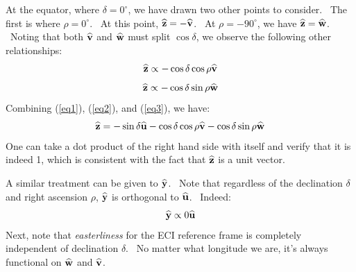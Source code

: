 \documentclass{article}
\newcommand{\tmstrong}[1]{\textbf{#1}}
\newcommand{\tmtextit}[1]{{\itshape{#1}}}
\begin{document}
At the equator, where $\delta = 0^{\circ}$, we have drawn two other points to
consider. \ The first is where $\rho = 0^{\circ}$. \ At this point,
$\widehat{\text{{\tmstrong{z}}}} = -
\text{$\widehat{\text{{\tmstrong{v}}}}$}$. \ At $\rho = - 90^{\circ}$, we have
$\widehat{\text{{\tmstrong{z}}}} = \text{$\widehat{\text{{\tmstrong{w}}}}$}$.
\ Noting that both $\text{$\widehat{\text{{\tmstrong{v}}}}$}$ and
$\text{$\widehat{\text{{\tmstrong{w}}}}$}$ must split $\cos \delta$, we
observe the following other relationships:
\begin{equation}
  \widehat{\text{{\tmstrong{z}}}} \propto - \cos \delta \cos \rho
  \text{$\widehat{\text{{\tmstrong{v}}}}$} \label{eq2}
\end{equation}
\begin{equation}
  \widehat{\text{{\tmstrong{z}}}} \propto - \cos \delta \sin \rho
  \text{$\widehat{\text{{\tmstrong{w}}}}$} \label{eq3}
\end{equation}
Combining (\ref{eq1}), (\ref{eq2}), and (\ref{eq3}), we have:
\begin{equation}
  \widehat{\text{{\tmstrong{z}}}} = - \sin \delta
  \text{$\widehat{\text{{\tmstrong{u}}}}$} - \cos \delta \cos \rho
  \text{$\widehat{\text{{\tmstrong{v}}}}$} - \cos \delta \sin \rho
  \text{$\widehat{\text{{\tmstrong{w}}}}$} \label{eqz}
\end{equation}
One can take a dot product of the right hand side with itself and verify that
it is indeed 1, which is consistent with the fact that
$\widehat{\text{{\tmstrong{z}}}}$ is a unit vector.

A similar treatment can be given to $\widehat{\text{{\tmstrong{y}}}}$. \ Note
that regardless of the declination $\delta$ and right ascension $\rho$,
$\widehat{\text{{\tmstrong{y}}}}$ is orthogonal to
$\text{$\widehat{\text{{\tmstrong{u}}}}$}$. \ Indeed:
\begin{equation}
  \widehat{\text{{\tmstrong{y}}}} \propto 0 \widehat{\text{{\tmstrong{u}}}}
  \label{eq5}
\end{equation}
Next, note that \tmtextit{easterliness} for the ECI reference frame is
completely independent of declination $\delta$. \ No matter what longitude we
are, it's always functional on $\text{$\widehat{\text{{\tmstrong{w}}}}$}$ and
$\text{$\widehat{\text{{\tmstrong{v}}}}$}$.
\end{document}
